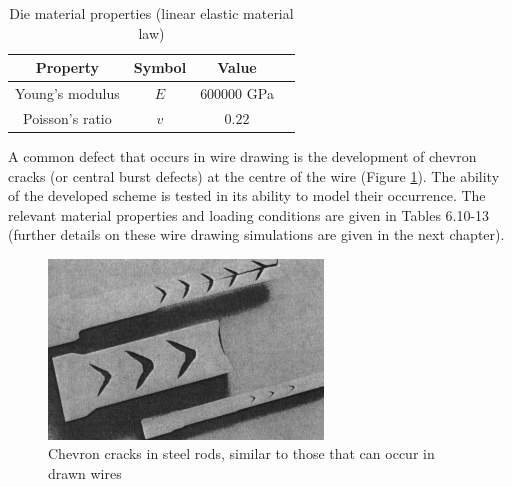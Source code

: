 \documentclass[sn-mathphys,Numbered,draft]{sn-jnl}%
\begin{document}
\begin{table}[htb]
	\centering
		\begin{tabular}{cccc} \hline
			Property & Symbol & Value  \\ \hline 
			Young's modulus & $E$ & $600000$ GPa \\
			Poisson's ratio & $v$ & $0.22$   \\
			\hline
		\end{tabular}
	\caption{Die material properties (linear elastic material law)}
	\label{tab:material_properties}
\end{table}

A common defect that occurs in wire drawing is the development of chevron cracks (or central burst defects) at the centre of the wire (Figure \ref{fig:chevronCracks}). The ability of the developed scheme is tested in its ability to model their occurrence. The relevant material properties and loading conditions are given in Tables 6.10-13 (further details on these wire drawing simulations are given in the next chapter). 

\begin{figure}[htb]
\begin{center}
	\includegraphics[width=0.65\textwidth]{./Figures/finiteVolumeCharacteristics/chevronCracked.png}
\caption{Chevron cracks in steel rods, similar to those that can occur in drawn wires \cite{krauss_steels_2015}}
\label{fig:chevronCracks}
\end{center}
\end{figure}
\end{document}
